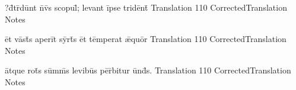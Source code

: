 \documentclass[]{book}
\begin{document}
\newpage

\latline
  {?d\={}tr\={}d\=unt n\={}v\={\macron {\i}}s sc\-op\-ul\={}; l\-ev\-ant \=ips\-e tr\-id\=ent\={\macron {\i}}}
  { Translation }
  {110}
  { CorrectedTranslation }
  { Notes }


\latline
  {\=et v\=ast\={}s \-ap\-er\=it s\=yrt\={\macron {\i}}s \=et t\=emp\-er\-at \={\ae}qu\=or}
  { Translation }
  {110}
  { CorrectedTranslation }
  { Notes }


\latline
  {\=atqu\-e r\-ot\={\macron {\i}}s s\=umm\={}s l\-ev\-ib\=us p\=er\={}b\-it\-ur \=und\={}s.}
  { Translation }
  {110}
  { CorrectedTranslation }
  { Notes }



\newpage
\end{document}
